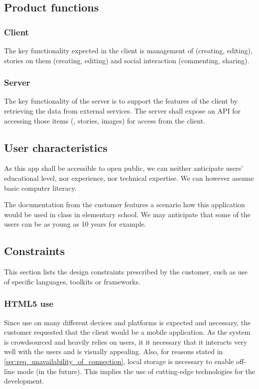 \documentclass[11pt]{book}
\begin{document}
\subsection{Product functions}

\subsubsection{Client}
The key functionality expected in the client is management of \wallentityp (creating, editing), stories on them (creating, editing) and social interaction (commenting, sharing).

\subsubsection{Server}
The key functionality of the server is to support the features of the client by retrieving the data from external services. The server shall expose an API for accessing those items (\wallentityp, stories, images) for access from the client.

\subsection{User characteristics} \label{sec:req_user_characteristics}
As this app shall be accessible to open public, we can neither anticipate users' educational level, nor experience, nor technical expertise. We can however assume basic computer literacy.

The documentation from the customer features a scenario how this application would be used in class in elementary school. We may anticipate that some of the users can be as young as 10 years for example.

\subsection{Constraints}

This section lists the design constraints prescribed by the customer, such as use of specific languages, toolkits or frameworks.

\subsubsection{HTML5 use}
Since use on many different devices and platforms is expected and necessary, the customer requested that the client would be a mobile application. As the system is crowdsourced and heavily relies on users, it it necessary that it interacts very well with the users and is visually appealing. Also, for reasons stated in \ref{sec:req_unavailability_of_connection}, local storage is necessary to enable off-line mode (in the future). This implies the use of cutting-edge technologies for the development.
\end{document}
